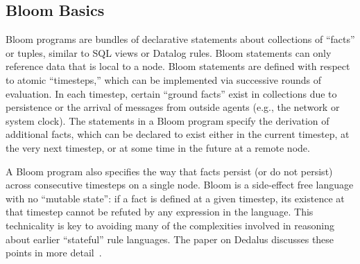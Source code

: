 \subsection{Bloom Basics}
Bloom programs are bundles of declarative statements about collections of
``facts'' or tuples, similar to SQL views or Datalog rules.  Bloom statements can
only reference data that is local to a node.  Bloom statements are defined with
respect to atomic ``timesteps,'' which can be implemented via successive rounds
of evaluation. In each timestep, certain ``ground facts'' exist in collections
due to persistence or the arrival of messages from outside agents (e.g., the
network or system clock).  The statements in a Bloom program specify the
derivation of additional facts, which can be declared to exist either in the
current timestep, at the very next timestep, or at some time in the future at a
remote node.

A Bloom program also specifies the way that facts persist (or do not persist)
across consecutive timesteps on a single node.  Bloom is a side-effect free
language with no ``mutable state'': if a fact is defined at a given timestep,
its existence at that timestep cannot be refuted by any expression in the
language.  This technicality is key to avoiding many of the complexities
involved in reasoning about earlier ``stateful'' rule languages.  The paper on
Dedalus discusses these points in more detail~\cite{dedalus}.

